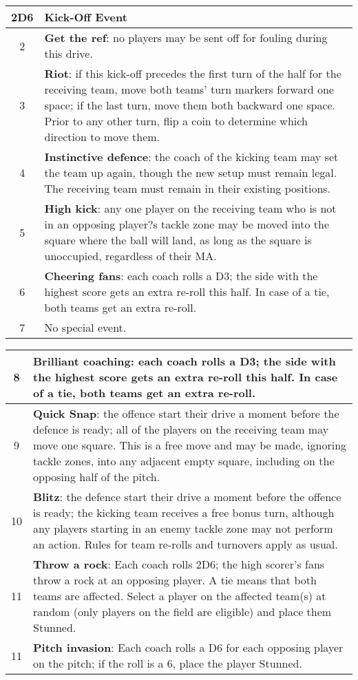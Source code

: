 \begin{multicols}{2}
\medskip
\begin{tabularx}{\linewidth}{ | c | X | }
\hline
\textbf{2D6} & \textbf{Kick-Off Event} \\ 
\hline
2 & \textbf{Get the ref}: no players may be sent off for fouling during this drive. \\
\hline
3 & \textbf{Riot}: if this kick-off precedes the first turn of the half for the receiving team, move both teams' turn markers forward one space; if the last turn, move them both backward one space. Prior to any other turn, flip a coin to determine which direction to move them. \\
\hline
4 & \textbf{Instinctive defence}: the coach of the kicking team may set the team up again, though the new setup must remain legal. The receiving team must remain in their existing positions. \\
\hline
5 & \textbf{High kick}: any one player on the receiving team who is not in an opposing player?s tackle zone may be moved into the square where the ball will land, as long as the square is unoccupied, regardless of their MA. \\
\hline
6 & \textbf{Cheering fans}: each coach rolls a D3; the side with the highest score gets an extra re-roll this half. In case of a tie, both teams get an extra re-roll. \\
\hline
7 & No special event. \\
\hline
\end{tabularx}

\begin{tabularx}{\linewidth}{ | c | X | }
\hline
8 & \textbf{Brilliant coaching}: each coach rolls a D3; the side with the highest score gets an extra re-roll this half. In case of a tie, both teams get an extra re-roll. \\
\hline
9 & \textbf{Quick Snap}: the offence start their drive a moment before the defence is ready; all of the players on the receiving team may move one square. This is a free move and may be made, ignoring tackle zones, into any adjacent empty square, including on the opposing half of the pitch. \\
\hline
10 & \textbf{Blitz}: the defence start their drive a moment before the offence is ready; the kicking team receives a free bonus turn, although any players starting in an enemy tackle zone may not perform an action. Rules for team re-rolls and turnovers apply as usual. \\
\hline
11 & \textbf{Throw a rock}: Each coach rolls 2D6; the high scorer's fans throw a rock at an opposing player. A tie means that both teams are affected. Select a player on the affected team(s) at random (only players on the field are eligible) and place them Stunned. \\
\hline
11 & \textbf{Pitch invasion}: Each coach rolls a D6 for each opposing player on the pitch; if the roll is a 6, place the player Stunned. \\
\hline
\end{tabularx}
\medskip


\end{multicols}
